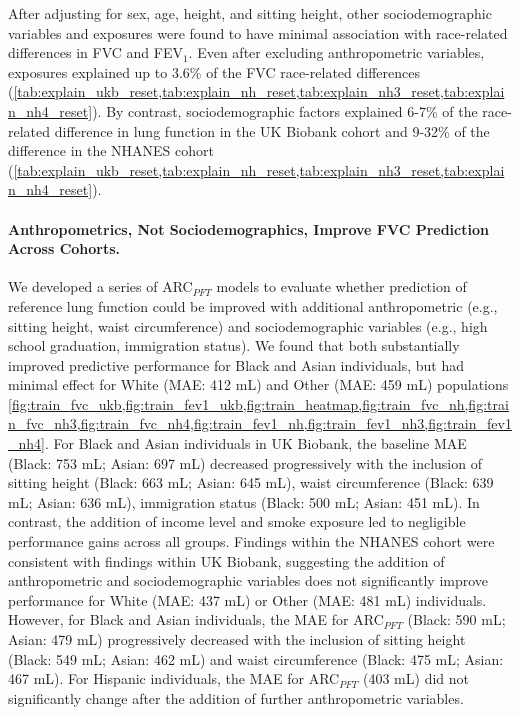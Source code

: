 \documentclass[10pt]{extarticle}
\begin{document}
After adjusting for sex, age, height, and sitting height, other sociodemographic variables and exposures were found to have minimal association with race-related differences in FVC and FEV$_{1}$. Even after excluding anthropometric variables, exposures explained up to 3.6\% of the FVC race-related differences (\cref{tab:explain_ukb_reset,tab:explain_nh_reset,tab:explain_nh3_reset,tab:explain_nh4_reset}). By contrast, sociodemographic factors explained 6-7\% of the race-related difference in lung function in the UK Biobank cohort and 9-32\% of the difference in the NHANES cohort (\cref{tab:explain_ukb_reset,tab:explain_nh_reset,tab:explain_nh3_reset,tab:explain_nh4_reset}).

\paragraph{Anthropometrics, Not Sociodemographics, Improve FVC Prediction Across Cohorts.}\label{ARC_NatureHealth_v2:anthropometrics-not-sociodemographics-improve-fvc-prediction-across-cohorts}

We developed a series of ARC$_{PFT}$ models to evaluate whether prediction of reference lung function could be improved with additional anthropometric (e.g., sitting height, waist circumference) and sociodemographic variables (e.g., high school graduation, immigration status). We found that both substantially improved predictive performance for Black and Asian individuals, but had minimal effect for White (MAE: 412 mL) and Other (MAE: 459 mL) populations \cref{fig:train_fvc_ukb,fig:train_fev1_ukb,fig:train_heatmap,fig:train_fvc_nh,fig:train_fvc_nh3,fig:train_fvc_nh4,fig:train_fev1_nh,fig:train_fev1_nh3,fig:train_fev1_nh4}. For Black and Asian individuals in UK Biobank, the baseline MAE (Black: 753 mL; Asian: 697 mL) decreased progressively with the inclusion of sitting height (Black: 663 mL; Asian: 645 mL), waist circumference (Black: 639 mL; Asian: 636 mL), immigration status (Black: 500 mL; Asian: 451 mL). In contrast, the addition of income level and smoke exposure led to negligible performance gains across all groups.
Findings within the NHANES cohort were consistent with findings within UK Biobank, suggesting the addition of anthropometric and sociodemographic variables does not significantly improve performance for White (MAE: 437 mL) or Other (MAE: 481 mL) individuals. However, for Black and Asian individuals, the MAE for ARC$_{PFT}$ (Black: 590 mL; Asian: 479 mL) progressively decreased with the inclusion of sitting height (Black: 549 mL; Asian: 462 mL) and waist circumference (Black: 475 mL; Asian: 467 mL). For Hispanic individuals, the MAE for ARC$_{PFT}$ (403 mL) did not significantly change after the addition of further anthropometric variables.
\end{document}
